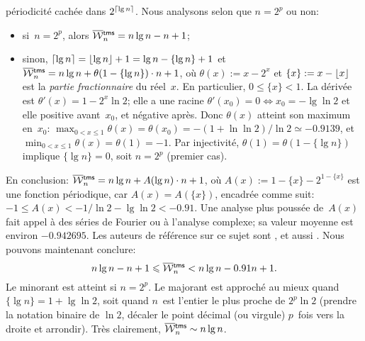 périodicité cachée dans \(2^{\lceil{\lg n}\rceil}\). Nous analysons selon
que \(n = 2^p\) ou non:
\begin{itemize}

  \item si~\(n=2^p\), alors \(\OW{\fun{tms}}{n} = n\lg n - n + 1\);

  \item sinon, \(\lceil{\lg n}\rceil = \lfloor{\lg n}\rfloor + 1 = \lg n - \{\lg
    n\} + 1\) et \(\OW{\fun{tms}}{n} = n\lg n + \theta(1 - \{\lg n\})
    \cdot n + 1\), où \(\theta(x) := x - 2^x\) et \(\{x\} := x -
    \lfloor{x}\rfloor\) est la \emph{partie fractionnaire} du réel~\(x\). En particulier, \(0 \leqslant
    \{x\} < 1\). La dérivée est \(\theta'(x) = 1 - 2^x\ln 2\); elle a
    une racine \(\theta'(x_0) = 0 \Leftrightarrow x_0 = -\lg\ln 2\) et
    elle positive avant~\(x_0\), et négative après.  Donc
    \(\theta(x)\) atteint son maximum en~\(x_0\): \(\max_{0<x\leqslant
      1}\theta(x) = \theta(x_0) = -(1+\ln\ln{2})/\!\ln{2} \simeq
    -0.9139\), et \(\min_{0<x\leqslant 1}\theta(x) = \theta(1) =
    -1\). Par injectivité, \(\theta(1) = \theta(1-\{\lg n\})\)
    implique \(\{\lg n\} = 0\), soit \(n=2^p\) (premier cas).
\end{itemize}
En conclusion: \(\OW{\fun{tms}}{n} = n\lg n + A(\lg n) \cdot n + 1\),
où \(A(x) := 1 - \{x\} - 2^{1 - \{x\}}\) est une fonction périodique,
car \(A(x) = A(\{x\})\), encadrée comme suit: \(-1 \leqslant A(x) <
-1/\!\ln 2 - \lg\ln 2 < -0.91\). Une analyse plus poussée de~\(A(x)\)
fait appel à des séries de Fourier ou à l'analyse complexe; sa valeur
moyenne est environ \(-0.942695\). Les auteurs de référence sur ce
sujet sont \cite{FlajoletGolin_1994}, et aussi
\cite{PannyProdinger_1995}. Nous pouvons maintenant conclure:
\begin{equation}
n\lg n - n + 1 \leqslant \OW{\fun{tms}}{n} <
n\lg n - 0.91 n + 1.\label{ineq:OWtms}
\end{equation}
Le minorant est atteint si \(n=2^p\). Le majorant est approché au
mieux quand \(\{\lg n\} = 1 + \lg\ln 2\), soit quand \(n\)~est
l'entier le plus proche de \(2^p\ln 2\) (prendre la notation binaire
de \(\ln 2\), décaler le point décimal (ou virgule) \(p\)~fois vers la
droite et arrondir). Très clairement, \(\OW{\fun{tms}}{n} \sim n\lg
n\). 


